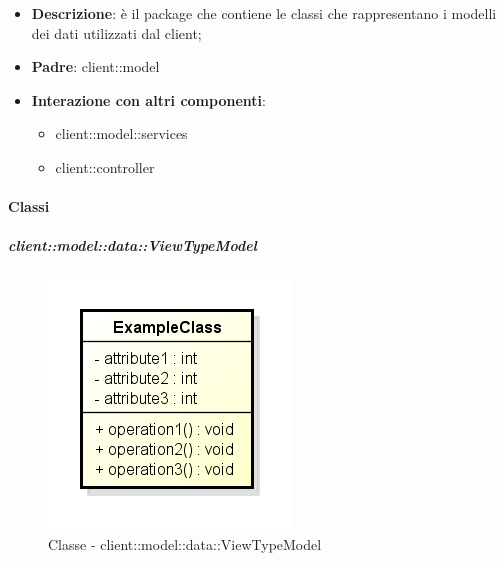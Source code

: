 \begin{itemize}
	\item \textbf{Descrizione}: è il package che contiene le classi che rappresentano i modelli dei dati utilizzati dal client;
	\item \textbf{Padre}: client::model
	\item \textbf{Interazione con altri componenti}:
		\begin{itemize}
			\item client::model::services
			\item client::controller
		\end{itemize}
\end{itemize}

	\paragraph{Classi} %
		\subparagraph{client::model::data::ViewTypeModel} %
		\label{subp:client_model_data_viewtypemodel}
			\begin{figure}[htbp]
				\centering
				\centerline{\includegraphics[scale=0.7]{./images/client/classes/example_class.png}}
				\caption{Classe - client::model::data::ViewTypeModel}
			\end{figure}
